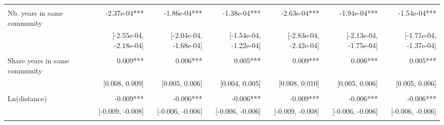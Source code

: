 \begin{table}[!h]
\begin{tabular}{lllllll}
\multicolumn{1}{l}{} &
  \multicolumn{1}{|r}{} &
  \multicolumn{1}{r}{} &
  \multicolumn{1}{r}{} &
  \multicolumn{1}{r}{} &
  \multicolumn{1}{r}{} &
  \multicolumn{1}{r}{} \\
\multicolumn{1}{l}{Nb. years in same community} &
  \multicolumn{1}{|r}{-2.37e-04***} &
  \multicolumn{1}{r}{-1.86e-04***} &
  \multicolumn{1}{r}{-1.38e-04***} &
  \multicolumn{1}{r}{-2.63e-04***} &
  \multicolumn{1}{r}{-1.94e-04***} &
  \multicolumn{1}{r}{-1.54e-04***} \\
\multicolumn{1}{l}{} &
  \multicolumn{1}{|r}{[-2.55e-04, -2.18e-04]} &
  \multicolumn{1}{r}{[-2.04e-04, -1.68e-04]} &
  \multicolumn{1}{r}{[-1.54e-04, -1.22e-04]} &
  \multicolumn{1}{r}{[-2.83e-04, -2.42e-04]} &
  \multicolumn{1}{r}{[-2.13e-04, -1.75e-04]} &
  \multicolumn{1}{r}{[-1.71e-04, -1.37e-04]} \\
\multicolumn{1}{l}{} &
  \multicolumn{1}{|r}{} &
  \multicolumn{1}{r}{} &
  \multicolumn{1}{r}{} &
  \multicolumn{1}{r}{} &
  \multicolumn{1}{r}{} &
  \multicolumn{1}{r}{} \\
\multicolumn{1}{l}{Share years in same community} &
  \multicolumn{1}{|r}{0.009***} &
  \multicolumn{1}{r}{0.006***} &
  \multicolumn{1}{r}{0.005***} &
  \multicolumn{1}{r}{0.009***} &
  \multicolumn{1}{r}{0.006***} &
  \multicolumn{1}{r}{0.005***} \\
\multicolumn{1}{l}{} &
  \multicolumn{1}{|r}{[0.008,   0.009]} &
  \multicolumn{1}{r}{[0.005,   0.006]} &
  \multicolumn{1}{r}{[0.004,   0.005]} &
  \multicolumn{1}{r}{[0.008,   0.010]} &
  \multicolumn{1}{r}{[0.005,   0.006]} &
  \multicolumn{1}{r}{[0.005,   0.006]} \\
\multicolumn{1}{l}{} &
  \multicolumn{1}{|r}{} &
  \multicolumn{1}{r}{} &
  \multicolumn{1}{r}{} &
  \multicolumn{1}{r}{} &
  \multicolumn{1}{r}{} &
  \multicolumn{1}{r}{} \\
\multicolumn{1}{l}{Ln(distance)} &
  \multicolumn{1}{|r}{-0.009***} &
  \multicolumn{1}{r}{-0.006***} &
  \multicolumn{1}{r}{-0.006***} &
  \multicolumn{1}{r}{-0.009***} &
  \multicolumn{1}{r}{-0.006***} &
  \multicolumn{1}{r}{-0.006***} \\
\multicolumn{1}{l}{} &
  \multicolumn{1}{|r}{[-0.009,  -0.008]} &
  \multicolumn{1}{r}{[-0.006,  -0.006]} &
  \multicolumn{1}{r}{[-0.006,  -0.006]} &
  \multicolumn{1}{r}{[-0.009,  -0.008]} &
  \multicolumn{1}{r}{[-0.006,  -0.006]} &
  \multicolumn{1}{r}{[-0.006,  -0.006]} \\
\multicolumn{1}{l}{} &
  \multicolumn{1}{|r}{} &
  \multicolumn{1}{r}{} &
  \multicolumn{1}{r}{} &

\end{tabular}
\end{table}
